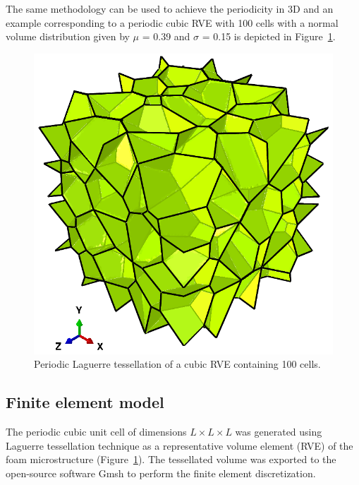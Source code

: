 \documentclass[review]{elsarticle}
\begin{document}
The same methodology can be used to achieve the periodicity in 3D and an example corresponding to a periodic cubic RVE with 100 cells with a normal volume distribution given by $\mu$ = 0.39 and $\sigma$ = 0.15 is depicted in Figure~\ref{fig:Periodic100Cell}.   
\begin{figure}[hb]
  \centering
  \includegraphics[scale=.6]{Periodic100Cell}
  \captionsetup{justification=centering}
  \caption[Close up of \textit{Hemidactylus} sp.]
   {Periodic Laguerre tessellation of a cubic RVE containing 100 cells.}
   \label{fig:Periodic100Cell}
\end{figure}
\subsection{Finite element model}
The periodic cubic unit cell of dimensions $L \times L \times L$ was generated using Laguerre tessellation technique as a representative volume element (RVE) of the foam microstructure (Figure~\ref{fig:Periodic100Cell}). The tessellated volume was exported to the open-source software Gmsh \citep{Gmsh} to perform the finite element discretization.
\end{document}
